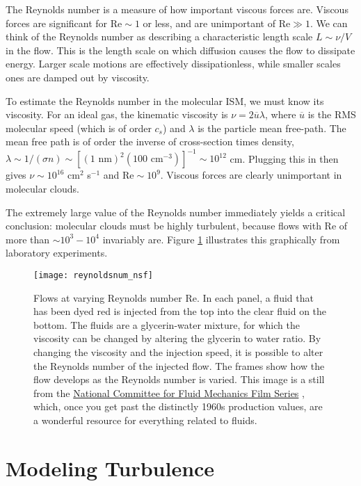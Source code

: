 The Reynolds number is a measure of how important viscous forces are. Viscous forces are significant for $\mathrm{Re} \sim 1$ or less, and are unimportant of $\mathrm{Re} \gg 1$. We can think of the Reynolds number as describing a characteristic length scale $L\sim \nu/V$ in the flow. This is the length scale on which diffusion causes the flow to dissipate energy. Larger scale motions are effectively dissipationless, while smaller scales ones are damped out by viscosity.

To estimate the Reynolds number in the molecular ISM, we must know its viscosity. For an ideal gas, the kinematic viscosity is $\nu=2\overline{u}\lambda$, where $\overline{u}$ is the RMS molecular speed (which is of order $c_s$) and $\lambda$ is the particle mean free-path. The mean free path is of order the inverse of cross-section times density, $\lambda \sim 1/(\sigma n) \sim [(1\mbox{ nm})^2 (100\mbox { cm}^{-3})]^{-1}\sim 10^{12}$ cm. Plugging this in then gives 
$\nu \sim 10^{16}$ cm$^2$ s$^{-1}$ and $\mathrm{Re} \sim 10^9$. Viscous forces are clearly unimportant in molecular clouds.

The extremely large value of the Reynolds number immediately yields a critical conclusion: molecular clouds must be highly turbulent, because flows with $\mathrm{Re}$ of more than $\sim 10^3-10^4$ invariably are. Figure \ref{fig:reynoldsnum_nsf} illustrates this graphically from laboratory experiments.

\begin{figure}
\texttt{[image: reynoldsnum\_nsf]}
\caption[Comparison of flows at varying Reynolds numbers]{
\label{fig:reynoldsnum_nsf}
Flows at varying Reynolds number Re. In each panel, a fluid that has been dyed red is injected from the top into the clear fluid on the bottom. The fluids are a glycerin-water mixture, for which the viscosity can be changed by altering the glycerin to water ratio. By changing the viscosity and the injection speed, it is possible to alter the Reynolds number of the injected flow. The frames show how the flow develops as the Reynolds number is varied. This image is a still from the \href{https://www.youtube.com/playlist?list=PL0EC6527BE871ABA3}{National Committee for Fluid Mechanics Film Series}  \citep{taylor64a}, which, once you get past the distinctly 1960s production values, are a wonderful resource for everything related to fluids.
}
\end{figure}

\section{Modeling Turbulence}

